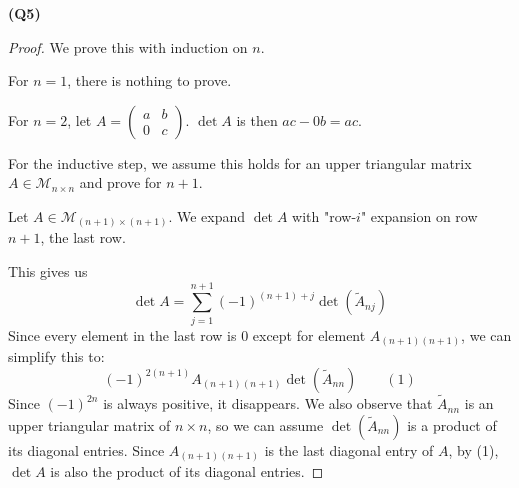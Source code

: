 \documentclass[12pt, a4paper]{article}
\begin{document}
\textbf{(Q5)}
\begin{proof}
    We prove this with induction on $n$.

    For $n = 1$, there is nothing to prove.

    For $n = 2$, let $A = \begin{pmatrix}a & b \\ 0 & c\end{pmatrix}$.
    $\det A$ is then $ac - 0b = ac$.

    For the inductive step, we assume this holds for an upper triangular
    matrix $A \in \mathcal{M}_{n \times n}$ and prove for $n + 1$.

    Let $A \in \mathcal{M}_{(n + 1) \times (n + 1)}$.
    We expand $\det A$ with "row-$i$" expansion on row $n + 1$, the last row.

    This gives us
    \[
        \det A = \sum_{j = 1}^{n + 1} (-1)^{(n + 1) + j}\det (\tilde{A}_{nj})
    \]
    Since every element in the last row is 0 except for element $A_{(n+1)(n+1)}$,
    we can simplify this to:
    \[
        (-1)^{2(n + 1)} A_{(n + 1)(n + 1)} \det (\tilde{A}_{nn})
        \quad\quad (1)
    \]
    Since $(-1)^{2n}$ is always positive, it disappears. We also observe
    that $\tilde{A}_{nn}$ is an upper triangular matrix of $n \times n$,
    so we can assume $\det (\tilde{A}_{nn})$ is a product of its diagonal
    entries.
    Since $A_{(n + 1)(n + 1)}$ is the last diagonal entry of $A$, by (1),
    $\det A$ is also the product of its diagonal entries.
\end{proof}
\end{document}
